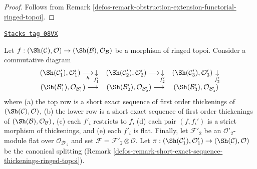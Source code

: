 \begin{proof}

Follows from Remark \ref{defos-remark-obstruction-extension-functorial-ringed-topoi}.
\end{proof}

\begin{definition}
\label{defos-situation-ses-flat-thickenings-ringed-topoi}
\href{https://stacks.math.columbia.edu/tag/08VX}{\texttt{Stacks tag 08VX}}

Let $f : (\Sh(\mathcal{C}), \mathcal{O}) \to
(\Sh(\mathcal{B}), \mathcal{O}_\mathcal{B})$ be a morphism of
ringed topoi. Consider a commutative diagram
$$
\begin{array}{ccc}(\Sh(\mathcal{C}'_1), \mathcal{O}'_1) \underset{h}{\longrightarrow}\underset{f'_1}{\downarrow} & (\Sh(\mathcal{C}'_2), \mathcal{O}'_2) \longrightarrow\underset{f'_2}{\downarrow} & (\Sh(\mathcal{C}'_3), \mathcal{O}'_3) \underset{f'_3}{\downarrow} \\ (\Sh(\mathcal{B}'_1), \mathcal{O}_{\mathcal{B}'_1}) \longrightarrow & (\Sh(\mathcal{B}'_2), \mathcal{O}_{\mathcal{B}'_2}) \longrightarrow & (\Sh(\mathcal{B}'_3), \mathcal{O}_{\mathcal{B}'_3})\end{array}
$$
where (a) the top row is a short exact sequence of first order thickenings
of $(\Sh(\mathcal{C}), \mathcal{O})$, (b) the lower row is a short exact
sequence of first order thickenings of
$(\Sh(\mathcal{B}), \mathcal{O}_\mathcal{B})$, (c) each $f'_i$ restricts
to $f$, (d) each pair $(f, f_i')$ is a strict morphism of thickenings, and
(e) each $f'_i$ is flat. Finally, let $\mathcal{F}'_2$ be an
$\mathcal{O}'_2$-module flat over $\mathcal{O}_{\mathcal{B}'_2}$ and
set $\mathcal{F} = \mathcal{F}'_2 \otimes \mathcal{O}$. Let
$\pi : (\Sh(\mathcal{C}'_1), \mathcal{O}'_1) \to
(\Sh(\mathcal{C}), \mathcal{O})$ be the canonical splitting
(Remark \ref{defos-remark-short-exact-sequence-thickenings-ringed-topoi}).
\end{definition}

